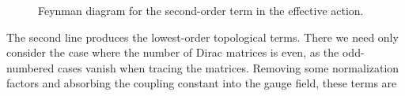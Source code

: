 \begin{figure}[!ht]
	\centering
	\caption{Feynman diagram for the second-order term in the effective action.}
	\label{fig:second_order_fd}
\end{figure}

The second line produces the lowest-order topological terms. There we need only consider the case where the number of Dirac matrices is even, as the odd-numbered cases vanish when tracing the matrices. Removing some normalization factors and absorbing the coupling constant into the gauge field, these terms are
